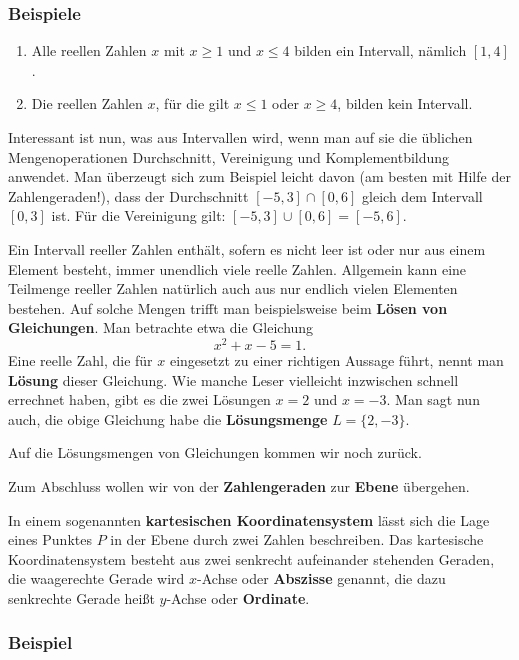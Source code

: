 \subsubsection{Beispiele}

\begin{enumerate}[label=\alph*)]
  \item Alle reellen Zahlen $x$ mit $x \geq 1$ und $x \leq 4$ bilden ein Intervall, nämlich $[1,4]$.
  \item Die reellen Zahlen $x$, für die gilt $x \leq 1$ oder $x \geq 4$, bilden kein Intervall.\beispielende
\end{enumerate}

Interessant ist nun, was aus Intervallen wird, wenn man auf sie die üblichen Mengenoperationen Durchschnitt, Vereinigung und Komplementbildung anwendet. Man überzeugt sich zum Beispiel leicht davon (am besten mit Hilfe der Zahlengeraden!), dass der Durchschnitt $[-5,3] \cap [0,6]$ gleich dem Intervall $[0,3]$ ist. Für die Vereinigung gilt: $[-5,3] \cup [0,6] = [-5,6]$.

Ein Intervall reeller Zahlen enthält, sofern es nicht leer ist oder nur aus einem Element besteht, immer unendlich viele reelle Zahlen. Allgemein kann eine Teilmenge reeller Zahlen natürlich auch aus nur endlich vielen Elementen bestehen. Auf solche Mengen trifft man beispielsweise beim \textbf{Lösen von Gleichungen}. Man betrachte etwa die Gleichung
\[ x^2 + x - 5 = 1 . \]
Eine reelle Zahl, die für $x$ eingesetzt zu einer richtigen Aussage führt, nennt man \textbf{Lösung} dieser Gleichung. Wie manche Leser vielleicht inzwischen schnell errechnet haben, gibt es die zwei Lösungen $x = 2$ und $x = -3$. Man sagt nun auch, die obige Gleichung habe die \textbf{Lösungsmenge} $L = \{2,-3\}$.

Auf die Lösungsmengen von Gleichungen kommen wir noch zurück.


Zum Abschluss wollen wir von der \textbf{Zahlengeraden} zur \textbf{Ebene} übergehen.

In einem sogenannten \textbf{kartesischen Koordinatensystem} lässt sich die Lage eines Punktes $P$ in der Ebene durch zwei Zahlen beschreiben. Das kartesische Koordinatensystem besteht aus zwei senkrecht aufeinander stehenden Geraden, die waagerechte Gerade wird $x$-Achse oder \textbf{Abszisse} genannt, die dazu senkrechte Gerade heißt $y$-Achse oder \textbf{Ordinate}.

\subsubsection{Beispiel}

